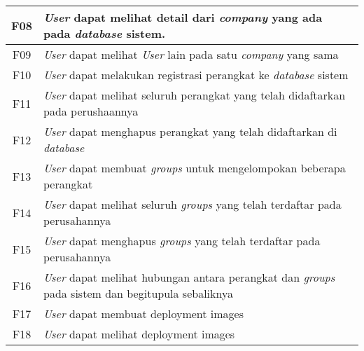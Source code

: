 \begin{table}[ht]
\begin{tabular}{|c|p{12cm}|}
    \\
    \hline
    F08 & \textit{User} dapat melihat detail dari \textit{company} yang ada pada \textit{database} sistem.                \\
    \hline
    F09 & \textit{User} dapat melihat \textit{User} lain pada satu \textit{company} yang sama                             \\
    \hline
    F10 & \textit{User} dapat melakukan registrasi perangkat ke \textit{database} sistem                                  \\
    \hline
    F11 & \textit{User} dapat melihat seluruh perangkat yang telah didaftarkan pada perushaannya                          \\
    \hline
    F12 & \textit{User} dapat menghapus perangkat yang telah didaftarkan di \textit{database}                             \\
    \hline
    F13 & \textit{User} dapat membuat \textit{groups} untuk mengelompokan beberapa perangkat                              \\
    \hline
    F14 & \textit{User} dapat melihat seluruh \textit{groups} yang telah terdaftar pada perusahannya                      \\
    \hline
    F15 & \textit{User} dapat menghapus \textit{groups} yang telah terdaftar pada perusahannya                            \\
    \hline
    F16 & \textit{User} dapat melihat hubungan antara perangkat dan \textit{groups} pada sistem dan begitupula sebaliknya \\
    \hline
    F17 & \textit{User} dapat membuat deployment images                                                                   \\
    \hline
    F18 & \textit{User} dapat melihat deployment images                                                                   \\
    \hline
  \end{tabular}
\end{table}
\egroup

\pagebreak


